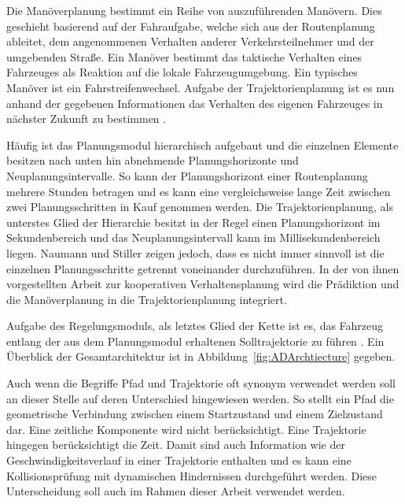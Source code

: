 Die Man\"overplanung bestimmt ein Reihe von auszuf\"uhrenden Man\"overn.
Dies geschieht basierend auf der Fahraufgabe, welche sich aus der Routenplanung ableitet, dem angenommenen Verhalten anderer Verkehrsteilnehmer und der umgebenden Stra{\ss}e.
Ein Man\"over bestimmt das taktische Verhalten eines Fahrzeuges als Reaktion auf die lokale Fahrzeugumgebung. \cite{Zhang2013}
Ein typisches Man\"over ist ein Fahrstreifenwechsel. 
Aufgabe der Trajektorienplanung ist es nun anhand der gegebenen Informationen das Verhalten des eigenen Fahrzeuges in n\"achster Zukunft zu bestimmen \cite{Ziegler2017}. 

H\"aufig ist das Planungsmodul hierarchisch aufgebaut und die einzelnen Elemente besitzen nach unten hin abnehmende Planungshorizonte und Neuplanungsintervalle. 
So kann der Planungshorizont einer Routenplanung mehrere Stunden betragen und es kann eine vergleichsweise lange Zeit zwischen zwei Planungsschritten in Kauf genommen werden. 
Die Trajektorienplanung, als unterstes Glied der Hierarchie besitzt in der Regel einen Planungshorizont im Sekundenbereich und das Neuplanungsintervall kann im Millisekundenbereich liegen. 
Naumann und Stiller \cite{Naumann2017towards} zeigen jedoch, dass es nicht immer sinnvoll ist die einzelnen Planungsschritte getrennt voneinander durchzuf\"uhren.
In der von ihnen vorgestellten Arbeit zur kooperativen Verhaltensplanung wird die Pr\"adiktion und die Man\"overplanung in die Trajektorienplanung integriert.

Aufgabe des Regelungsmoduls, als letztes Glied der Kette ist es, das Fahrzeug entlang der aus dem Planungsmodul erhaltenen Solltrajektorie zu f\"uhren \cite{Ziegler2017}. 
Ein \"Uberblick der Gesamtarchitektur ist in Abbildung~\ref{fig:ADArchtiecture} gegeben.

Auch wenn die Begriffe Pfad und Trajektorie oft synonym verwendet werden soll an dieser Stelle auf deren Unterschied hingewiesen werden.  
So stellt ein Pfad die geometrische Verbindung zwischen einem Startzustand und einem Zielzustand dar. 
Eine zeitliche Komponente wird nicht ber\"ucksichtigt. 
Eine Trajektorie hingegen ber\"ucksichtigt die Zeit. 
Damit sind auch Information wie der Geschwindigkeitsverlauf in einer Trajektorie enthalten und es kann eine Kollisionspr\"ufung mit dynamischen Hindernissen durchgef\"uhrt werden. 
Diese Unterscheidung soll auch im Rahmen dieser Arbeit verwendet werden. \cite{Rathgeber2016}


